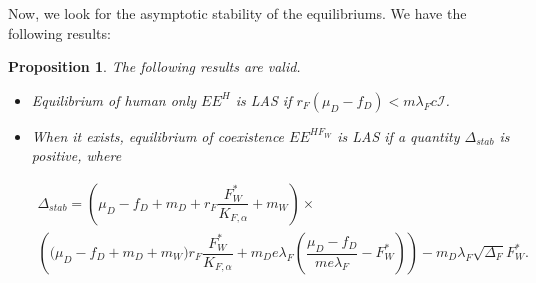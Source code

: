 \documentclass{article}
\newcommand{\lfw}{\lambda_{F}}
\newcommand{\lfw}{\lambda_{F}}
\newtheorem{prop}{Proposition}
\begin{document}
Now, we look for the asymptotic stability of the equilibriums. We have the following results:

\begin{prop}\label{propLAS} The following results are valid.
\begin{itemize}
\item Equilibrium of human only $EE^{H}$ is LAS if $r_F(\mu_D - f_D) < m \lfw c\mathcal{I}$.
\item When it exists, equilibrium of coexistence $EE^{HF_W}$ is LAS if a quantity $\Delta_{stab}$ is positive, where 

\begin{multline*}
\Delta_{stab} = \left(\mu_D -f_D + m_D + r_F \dfrac{F_W^*}{K_{F, \alpha}} + m_W\right) \times \\
\left(\big( \mu_D -f_D + m_D + m_W) r_F \dfrac{F^*_W}{K_{F, \alpha}}   + m_D e\lfw   \left(\dfrac{\mu_D - f_D}{m e\lfw} - F^*_W \right)\right) - m_D \lfw \sqrt{\Delta_F}  F^*_{W}.
\end{multline*}
\end{itemize}
\end{prop}
\end{document}

